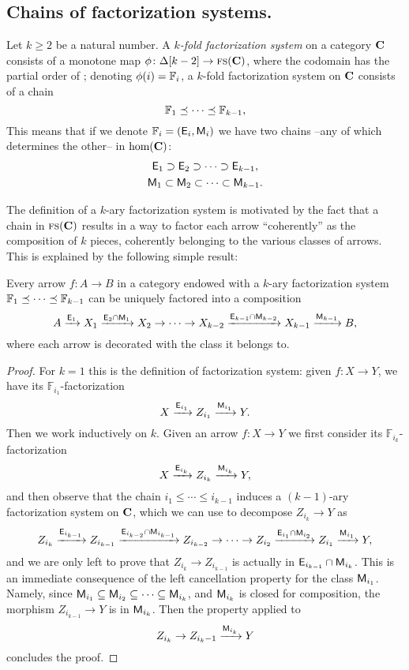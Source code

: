 \subsection{Chains of factorization systems.}
\begin{definition}\label{mult.fs}
Let $k \ge 2$ be a natural number. A \emph{$k$\hyp{}fold factorization system} on a category $\mathbf{C}$ consists of a monotone map $\phi\colon \Delta[k-2]\to \textsc{fs}(\mathbf{C})$, where the codomain has the partial order of \adef {}; denoting $\phi(i)=\mathbb{F}_i$, a $k$\hyp{}fold factorization system on $\mathbf{C}$ consists of a chain
\[
\mathbb{F}_1 \preceq \dots \preceq \mathbb{F}_{k-1},
\]
This means that if we denote $\mathbb{F}_i = (\mathsf{E}_i, \mathsf{M}_i)$ we have two chains --any of which determines the other-- in $\text{hom}(\mathbf{C})$:
\begin{gather*}
\mathsf{E}_1\supset \mathsf{E}_2 \supset\dots\supset \mathsf{E}_{k-1},\\
\mathsf{M}_1\subset \mathsf{M}_2 \subset\dots\subset \mathsf{M}_{k-1}.
\end{gather*}
\end{definition}
The definition of a $k$\hyp{}ary factorization system is motivated by the fact that a chain in $\textsc{fs}(\mathbf{C})$ results in a way to factor each arrow ``coherently'' as the composition of $k$ pieces, coherently belonging to the various classes of arrows. This is explained by the following simple result:
\begin{lemma}\label{multiple.fact}
Every arrow $f\colon A\to B$ in a category endowed with a $k$\hyp{}ary factorization system $\mathbb{F}_1\preceq\dots\preceq \mathbb{F}_{k-1}$ can be uniquely factored into a composition
\[
A \xrightarrow{\mathsf{E}_1} X_1 \xrightarrow{\mathsf{E}_2\cap \mathsf{M}_1} X_2\to\dots\to X_{k-2} \xrightarrow{\mathsf{E}_{k-1}\cap \mathsf{M}_{k-2}} X_{k-1} \xrightarrow{\mathsf{M}_{k-1}} B,
\]
where each arrow is decorated with the class it belongs to.
\end{lemma}
\begin{proof}
For $k=1$ this is the definition of factorization system: given $f\colon X\to Y$, we have its $\mathbb{F}_{i_1}$\hyp{}factorization
\[
X \xrightarrow{\mathsf{E}_{i_1}} Z_{i_1}  \xrightarrow{\mathsf{M}_{i_{1}}} Y.
\]
Then we work inductively on $k$. Given an arrow $f\colon X\to Y$ we first consider its $\mathbb{F}_{i_k}$\hyp{}factorization
\[
X \xrightarrow{\mathsf{E}_{i_k}} Z_{i_k}  \xrightarrow{\mathsf{M}_{i_{k}}} Y,
\]
and then observe that the chain $i_1\leq\cdots\leq i_{k-1}$ induces a $(k-1)$\hyp{}ary factorization system on $\mathbf{C}$, which we can use to decompose $Z_{i_k}\to Y$ as
\[
Z_{i_k} \xrightarrow{\mathsf{E}_{i_{k-1}}} Z_{i_{k-1}} \xrightarrow{\mathsf{E}_{i_{k-2}}\cap \mathsf{M}_{i_{k-1}}} Z_{i_{k-2}}\to\dots\to Z_{i_{2}}\xrightarrow{\mathsf{E}_{i_{1}}\cap \mathsf{M}_{i_{2}}} Z_{i_{1}} \xrightarrow{\mathsf{M}_{i_{1}}} Y,
\]
and we are only left to prove that $Z_{i_{k}} \to Z_{i_{k-1}}$ is actually in $\mathsf{E}_{i_{k-1}}\cap \mathsf{M}_{i_{k}}$. This is an immediate consequence of the left cancellation property for the class $\mathsf{M}_{i_{1}}$. Namely, since $\mathsf{M}_{i_1}\subseteq \mathsf{M}_{i_2} \subseteq\dots\subseteq \mathsf{M}_{i_k}$, and $ \mathsf{M}_{i_k}$ is closed for composition, the morphism $Z_{i_{k-1}}\to Y$ is in $\mathsf{M}_{i_k}$. Then the  property applied to
\[
Z_{i_{k}}\to Z_{i_k-1}\xrightarrow{\mathsf{M}_{i_k}} Y
\]
concludes the proof.
\end{proof}
